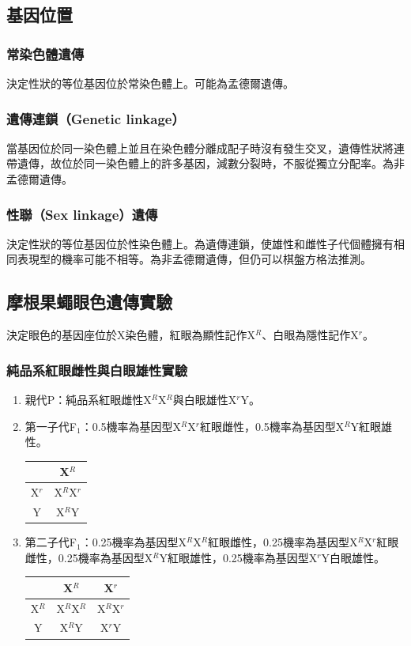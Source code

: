 \documentclass[a4paper,12pt]{report}
\begin{document}
\subsection{基因位置}
\subsubsection{常染色體遺傳}
決定性狀的等位基因位於常染色體上。可能為孟德爾遺傳。
\subsubsection{遺傳連鎖（Genetic linkage）}
當基因位於同一染色體上並且在染色體分離成配子時沒有發生交叉，遺傳性狀將連帶遺傳，故位於同一染色體上的許多基因，減數分裂時，不服從獨立分配率。為非孟德爾遺傳。
\subsubsection{性聯（Sex linkage）遺傳}
決定性狀的等位基因位於性染色體上。為遺傳連鎖，使雄性和雌性子代個體擁有相同表現型的機率可能不相等。為非孟德爾遺傳，但仍可以棋盤方格法推測。
\subsection{摩根果蠅眼色遺傳實驗}
決定眼色的基因座位於X染色體，紅眼為顯性記作Χ$^R$、白眼為隱性記作X$^r$。
\subsubsection{純品系紅眼雌性與白眼雄性實驗}
\begin{enumerate}
\item 親代P：純品系紅眼雌性X$^R$X$^R$與白眼雄性X$^r$Y。
\item 第一子代F$_1$：0.5機率為基因型X$^R$X$^r$紅眼雌性，0.5機率為基因型X$^R$Y紅眼雄性。
  \begin{longtable}[c]{|c|c|}
\hline
& X$^R$ \\ \hline
X$^r$ & X$^R$X$^r$ \\ \hline
Y & X$^R$Y \\ \hline
\end{longtable}
\item 第二子代F$_1$：0.25機率為基因型X$^R$X$^R$紅眼雌性，0.25機率為基因型X$^R$X$^r$紅眼雌性，0.25機率為基因型X$^R$Y紅眼雄性，0.25機率為基因型X$^r$Y白眼雄性。
\begin{longtable}[c]{|c|c|c|}
\hline
& X$^R$ & X$^r$ \\ \hline
X$^R$ & X$^R$X$^R$ & X$^R$X$^r$ \\ \hline
Y & X$^R$Y & X$^r$Y \\ \hline
\end{longtable}
\end{enumerate}
\end{document}
